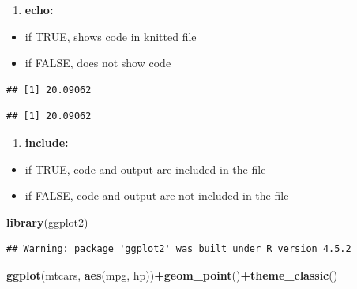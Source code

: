 \documentclass[
]{article}
\newenvironment{Shaded}{\begin{snugshade}}{\end{snugshade}}
\newcommand{\FunctionTok}[1]{\textcolor[rgb]{0.13,0.29,0.53}{\textbf{#1}}}
\newcommand{\NormalTok}[1]{#1}
\newcommand{\SpecialCharTok}[1]{\textcolor[rgb]{0.81,0.36,0.00}{\textbf{#1}}}
\providecommand{\tightlist}{%
  \setlength{\itemsep}{0pt}\setlength{\parskip}{0pt}}
\begin{document}
\begin{enumerate}
\def\labelenumi{\arabic{enumi}.}
\tightlist
\item
  \textbf{echo:}
\end{enumerate}

\begin{itemize}
\tightlist
\item
  if TRUE, shows code in knitted file
\item
  if FALSE, does not show code
\end{itemize}

\begin{Shaded}
\end{Shaded}

\begin{verbatim}
## [1] 20.09062
\end{verbatim}

\begin{verbatim}
## [1] 20.09062
\end{verbatim}

\begin{enumerate}
\def\labelenumi{\arabic{enumi}.}
\setcounter{enumi}{1}
\tightlist
\item
  \textbf{include:}
\end{enumerate}

\begin{itemize}
\tightlist
\item
  if TRUE, code and output are included in the file
\item
  if FALSE, code and output are not included in the file
\end{itemize}

\begin{Shaded}
\begin{Highlighting}[]
\FunctionTok{library}\NormalTok{(ggplot2)}
\end{Highlighting}
\end{Shaded}

\begin{verbatim}
## Warning: package 'ggplot2' was built under R version 4.5.2
\end{verbatim}

\begin{Shaded}
\begin{Highlighting}[]
\FunctionTok{ggplot}\NormalTok{(mtcars, }\FunctionTok{aes}\NormalTok{(mpg, hp))}\SpecialCharTok{+}\FunctionTok{geom\_point}\NormalTok{()}\SpecialCharTok{+}\FunctionTok{theme\_classic}\NormalTok{()}
\end{Highlighting}
\end{Shaded}
\end{document}
